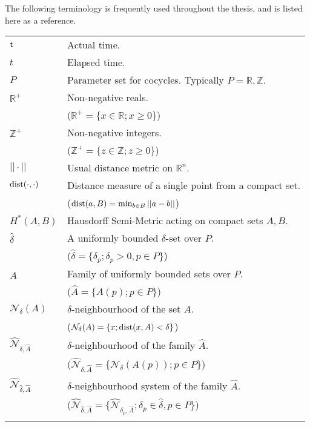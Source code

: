 
The following terminology is frequently used throughout the
thesis, and is listed here as a reference.

\begin{tabular}{ll}
  $ \mathsf{\mathsf{t}}$       & Actual time. \\
  $t$       & Elapsed time. \\
  $P$       & Parameter set for cocycles. Typically $P=\mathbb{R},
              \mathbb{Z}$. \\
  $\mathbb{R}^+$ & Non-negative reals. \\
             & \hspace{2cm} ($\mathbb{R}^+ = \{x \in \mathbb{R}; x \geq 0 \}$) \\  
  $\mathbb{Z}^+$ & Non-negative integers. \\
             & \hspace{2cm} ($\mathbb{Z}^+ = \{z \in \mathbb{Z}; z \geq 0 \}$) \\
  $|| \cdot ||$ \hspace{2cm} & Usual distance metric on
              $\mathbb{R}^n$. \\
  ${\rm dist}(\cdot,\cdot)$ & Distance measure of a single point from a
              compact set. \\
            & \hspace{2cm} (${\rm dist}(a,B) = \min_{b \in B}||a -
              b||$) \\
  $H^*(A,B)$  & Hausdorff Semi-Metric acting on compact sets $A, B$. \\
  $\hat{\delta}$ & A uniformly bounded $\delta$-set over $P$. \\
            & \hspace{2cm} ($\hat{\delta} = \{ \delta_p ;\delta_p>0, p \in
              P \}$) \\
  $\hat{A}$ & Family of uniformly bounded sets over $P$. \\
            & \hspace{2cm} ($\hat{A} = \{A(p); p \in P \}$) \\
  $\mathcal{N}_{\delta}(A)$ & $\delta$-neighbourhood of the set $A$. \\
            & \hspace{2cm} ($\mathcal{N}_{\delta}(A) = \{x;{\rm dist}(x,A)
              <\delta \}$) \\
  $\hat{\mathcal{N}}_{\delta,\hat{A}}$ & $\delta$-neighbourhood of the
              family $\hat{A}$. \\
            & \hspace{2cm} ($\hat{\mathcal{N}}_{\delta,\hat{A}} = \{
              \mathcal{N}_{\delta}(A(p)) ; p \in P \}$) \\
  $\hat{\mathcal{N}}_{\hat{\delta},\hat{A}}$ & $\delta$-neighbourhood
              system of the family $\hat{A}$. \\
            & \hspace{2cm} ($\hat{\mathcal{N}}_{\hat{\delta},\hat{A}} = \{
              \hat{\mathcal{N}}_{\delta_p,\hat{A}} ; \delta_p \in
              \hat{\delta}, p \in P \}$) \\
\\ \end{tabular}

